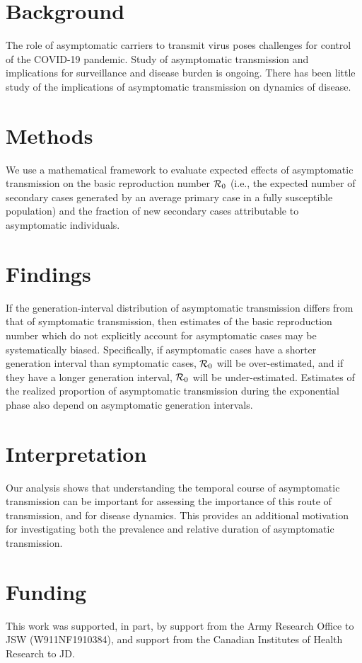 {\footnotesize 
\section*{Background}

The role of asymptomatic carriers to transmit virus poses challenges for control of the COVID-19 pandemic. 
Study of asymptomatic transmission and implications for surveillance and disease burden is ongoing. 
There has been little study of the implications of asymptomatic transmission on dynamics of disease.

\section*{Methods}

We use a mathematical framework to evaluate expected effects of asymptomatic transmission on the basic reproduction number ${\cal{R}}_0$ (i.e., the expected number of secondary cases generated by an average primary case in a fully susceptible population) and the fraction of new secondary cases attributable to asymptomatic individuals.

\section*{Findings}

If the generation-interval distribution of asymptomatic transmission differs from that of symptomatic transmission, then estimates of the basic reproduction number which do not explicitly account for asymptomatic cases may be systematically biased. 
Specifically, if asymptomatic cases have a shorter generation interval than symptomatic cases, ${\cal{R}}_0$ will be over-estimated, and if they have a longer generation interval, ${\cal{R}}_0$ will be under-estimated.
Estimates of the realized proportion of asymptomatic transmission during the exponential phase also depend on asymptomatic generation intervals.

\section*{Interpretation}

Our analysis shows that understanding the temporal course of asymptomatic transmission can be important for assessing the importance of this route of transmission, and for disease dynamics. This provides an additional motivation for investigating both the prevalence and relative duration of asymptomatic transmission. 

\section*{Funding}

This work was supported, in part, by support from the Army Research Office to JSW (W911NF1910384), and support from the Canadian Institutes of Health Research to JD.}
